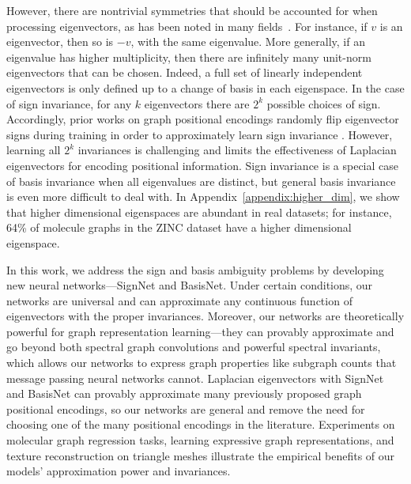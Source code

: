 \documentclass{article} \usepackage{iclr2023_conference,times}
\begin{document}
However, there are nontrivial symmetries that should be accounted for when processing eigenvectors, as has been noted in many fields~\citep{eastment1982cross, rustamov2007laplace, bro2008resolving, ovsjanikov2008global}. For instance, if $v$ is an eigenvector, then so is $-v$, with the same eigenvalue. More generally, if an eigenvalue has higher multiplicity, then there are infinitely many unit-norm eigenvectors that can be chosen. Indeed, a full set of linearly independent eigenvectors is only defined up to a change of basis in each eigenspace. 
In the case of sign invariance, for any $k$ eigenvectors there are $2^k$ possible choices of sign. Accordingly, prior works on graph positional encodings randomly flip eigenvector signs during training in order to approximately learn sign invariance \citep{kreuzer2021rethinking, dwivedi2020benchmarking, kim2022pure}.  However, learning all $2^k$ invariances is challenging and limits the effectiveness of Laplacian eigenvectors for encoding positional information. Sign invariance is a special case of basis invariance when all eigenvalues are distinct, but general basis invariance is even more difficult to deal with.
In Appendix~\ref{appendix:higher_dim}, we show that higher dimensional eigenspaces are abundant in real datasets; for instance, 64\% of molecule graphs in the ZINC dataset have a higher dimensional eigenspace.


In this work, we address the sign and basis ambiguity problems by developing new neural networks---SignNet and BasisNet.
Under certain conditions, our networks are universal and can approximate any continuous function of eigenvectors with the proper invariances.
Moreover, our networks are theoretically powerful for graph representation learning---they can provably approximate and go beyond both spectral graph convolutions and powerful spectral invariants, which allows our networks to express graph properties like subgraph counts that message passing neural networks cannot. Laplacian eigenvectors with SignNet and BasisNet can provably approximate many previously proposed graph positional encodings, so our networks are general and remove the need for choosing one of the many positional encodings in the literature.
Experiments on molecular graph regression tasks, learning expressive graph representations, and texture reconstruction on triangle meshes illustrate the empirical benefits of our models' approximation power and invariances. 
\end{document}
